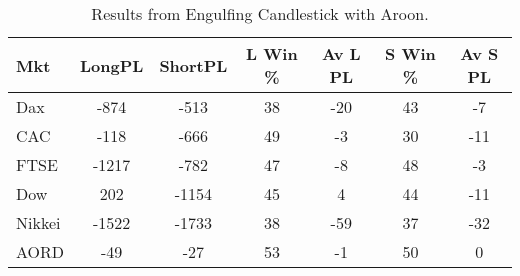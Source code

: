 \begin{table}[ht]
\centering
\caption[Engulfing Candlestick System with Aroon]{Results from Engulfing Candlestick with Aroon.} 
\label{tab:engulf_aroon_results}
\begin{tabular}{lcccccc}
  \toprule Mkt & LongPL & ShortPL & L Win \% & Av L PL & S Win \% & Av S PL \\ 
  \midrule Dax & -874 & -513 & 38 & -20 & 43 & -7 \\ 
  CAC & -118 & -666 & 49 & -3 & 30 & -11 \\ 
  FTSE & -1217 & -782 & 47 & -8 & 48 & -3 \\ 
  Dow & 202 & -1154 & 45 & 4 & 44 & -11 \\ 
  Nikkei & -1522 & -1733 & 38 & -59 & 37 & -32 \\ 
  AORD & -49 & -27 & 53 & -1 & 50 & 0 \\ 
   \bottomrule \end{tabular}
\end{table}
